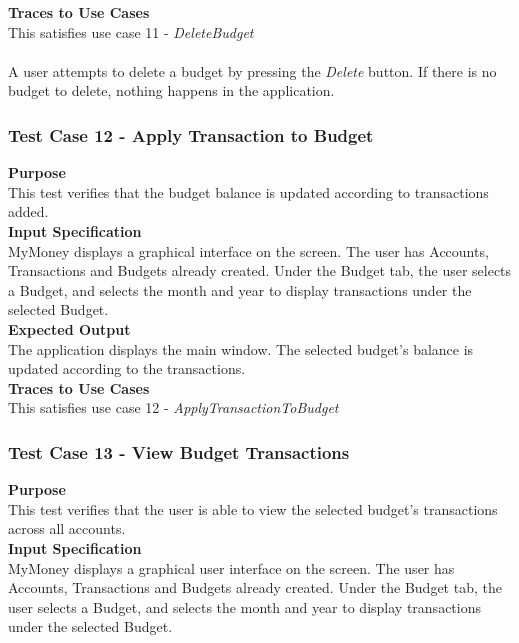 \documentclass[12pt]{article}
\begin{document}
\noindent
{\bf Traces to Use Cases}\\
This satisfies use case 11 - \textit{DeleteBudget}\\

\\
A user attempts to delete a budget by pressing the \textit{Delete} button. If there is no budget to delete, nothing happens in the application.\\

\subsubsection{Test Case 12 - Apply Transaction to Budget} \label{TC-12}
\noindent
{\bf Purpose}\\
This test verifies that the budget balance is updated according to transactions added.\\
                                                    
\noindent
{\bf Input Specification}\\
MyMoney displays a graphical interface on the screen. The user has Accounts, Transactions and Budgets already created. Under the Budget tab, the user selects a Budget, and selects the month and year to display transactions under the selected Budget.\\

\noindent
{\bf Expected Output}\\
The application displays the main window. The selected budget's balance is updated according to the transactions.\\

\noindent
{\bf Traces to Use Cases}\\
This satisfies use case 12 - \textit{ApplyTransactionToBudget}\\

\clearpage 

\subsubsection{Test Case 13 - View Budget Transactions} \label{TC-13}
\noindent
{\bf Purpose}\\
This test verifies that the user is able to view the selected budget's transactions across all accounts.\\                    
                            
\noindent
{\bf Input Specification}\\
MyMoney displays a graphical user interface on the screen. The user has Accounts, Transactions and Budgets already created. Under the Budget tab, the user selects a Budget, and selects the month and year to display transactions under the selected Budget.\\
\end{document}
